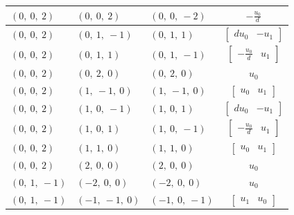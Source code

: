 \documentclass[11pt]{article}
\theoremstyle{definition}
\begin{document}
\begin{longtable}{|l|l|l|c|}
    \hline
    $\left( 0, \  0, \  2\right)$ & $\left( 0, \  0, \  2\right)$ & $\left( 0, \  0, \  -2\right)$ & $- \frac{u_{0}}{d}$ \\
    \hline
    $\left( 0, \  0, \  2\right)$ & $\left( 0, \  1, \  -1\right)$ & $\left( 0, \  1, \  1\right)$ & $\left[\begin{matrix}d u_{0} & - u_{1}\end{matrix}\right]$ \\
    \hline
    $\left( 0, \  0, \  2\right)$ & $\left( 0, \  1, \  1\right)$ & $\left( 0, \  1, \  -1\right)$ & $\left[\begin{matrix}- \frac{u_{0}}{d} & u_{1}\end{matrix}\right]$ \\
    \hline
    $\left( 0, \  0, \  2\right)$ & $\left( 0, \  2, \  0\right)$ & $\left( 0, \  2, \  0\right)$ & $u_{0}$ \\
    \hline
    $\left( 0, \  0, \  2\right)$ & $\left( 1, \  -1, \  0\right)$ & $\left( 1, \  -1, \  0\right)$ & $\left[\begin{matrix}u_{0} & u_{1}\end{matrix}\right]$ \\
    \hline
    $\left( 0, \  0, \  2\right)$ & $\left( 1, \  0, \  -1\right)$ & $\left( 1, \  0, \  1\right)$ & $\left[\begin{matrix}d u_{0} & - u_{1}\end{matrix}\right]$ \\
    \hline
    $\left( 0, \  0, \  2\right)$ & $\left( 1, \  0, \  1\right)$ & $\left( 1, \  0, \  -1\right)$ & $\left[\begin{matrix}- \frac{u_{0}}{d} & u_{1}\end{matrix}\right]$ \\
    \hline
    $\left( 0, \  0, \  2\right)$ & $\left( 1, \  1, \  0\right)$ & $\left( 1, \  1, \  0\right)$ & $\left[\begin{matrix}u_{0} & u_{1}\end{matrix}\right]$ \\
    \hline
    $\left( 0, \  0, \  2\right)$ & $\left( 2, \  0, \  0\right)$ & $\left( 2, \  0, \  0\right)$ & $u_{0}$ \\
    \hline
    $\left( 0, \  1, \  -1\right)$ & $\left( -2, \  0, \  0\right)$ & $\left( -2, \  0, \  0\right)$ & $u_{0}$ \\
    \hline
    $\left( 0, \  1, \  -1\right)$ & $\left( -1, \  -1, \  0\right)$ & $\left( -1, \  0, \  -1\right)$ & $\left[\begin{matrix}u_{1} & u_{0}\end{matrix}\right]$ \\

\end{longtable}
\end{document}
